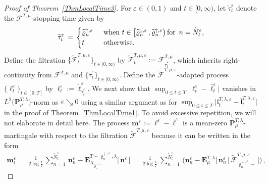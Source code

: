 \documentclass[10pt]{article}
\numberwithin{equation}{section}
\theoremstyle{definition}
\begin{document}
\begin{proof}[Proof of Theorem~\ref{ThmLocalTime3}]
For $\varepsilon\in (0,1)$ and $t\in [0,\infty)$, let   $\widetilde{\tau}_t^{\varepsilon}$ denote the $\mathscr{F}^{T,\mu}$-stopping time given  by
\begin{align*}
    \widetilde{\tau}_t^{\varepsilon}\,=\,\begin{cases}    \widetilde{\varrho}_{n}^{\uparrow,\varepsilon}   &   \,\,\,\text{when}\,\, t\in  \big[\widetilde{\varrho}_{n}^{\downarrow,\varepsilon}\,, \widetilde{\varrho}_{n}^{\uparrow,\varepsilon}\big) \,\text{for\,  $n=\widetilde{N}_{t}^{\varepsilon}$,} \\ t & \,\,\,\text{otherwise.}      \end{cases}
\end{align*}
Define the filtration $\{\widetilde{\mathscr{F}}^{T,\mu,\varepsilon}_{t}\}_{t\in [0,\infty)}$ by $\widetilde{\mathscr{F}}_{t}^{T,\mu,\varepsilon}:=\mathscr{F}_{\widetilde{\tau}_t^{\varepsilon}}^{T,\mu}$, which inherits right-continuity  from $\mathscr{F}^{T,\mu}$ and $\{\widetilde{\tau}^{\varepsilon}_t\}_{t\in [0,\infty)}$.  Define the $\widetilde{\mathscr{F}}^{T,\mu,\varepsilon}$-adapted process  $\{ \boldsymbol{\ell}_t^{\varepsilon}\}_{t\in [0,T]}$ by $\boldsymbol{\ell}_t^{\varepsilon}:=\widetilde{\ell}_{\widetilde{\tau}_t^{\varepsilon}}^{\varepsilon} $. 
 We next show that $\sup_{0\leq t\leq T}\big| \boldsymbol{\ell}_t^{\varepsilon}- \boldsymbol{\bar{\ell}}_t^{\varepsilon}\big| $
vanishes in $L^2\big(\mathbf{P}^{T,\lambda}_{\mu}\big)$-norm as $\varepsilon\searrow 0$ using a similar argument as for $\sup_{0\leq t\leq T}\big| \mathfrak{l}_t^{T,\lambda,\varepsilon}- \bar{\mathfrak{l}}_t^{T,\lambda,\varepsilon}\big| $ in the proof of Theorem~\ref{ThmLocalTime1}.  To avoid excessive repetition, we will not elaborate in detail here. The process $\mathbf{m}^{\varepsilon}:=\boldsymbol{\ell}^{\varepsilon}-\boldsymbol{\bar{\ell}}^{\varepsilon} $ is a mean-zero $\mathbf{P}^{T,\lambda}_{\mu }$-martingale with respect to the filtration $\widetilde{\mathscr{F}}^{T,\mu,\varepsilon}$ because  it can be written in the form
\begin{align*}
\mathbf{m}^{\varepsilon}_t\,=\,   \frac{1}{2\log \frac{1}{\varepsilon} } \,\sum_{n=1}^{\widetilde{N}_t^{\varepsilon}}\,  \mathbf{n}^{\varepsilon}_n-\mathbf{E}^{T-\widetilde{\varrho}_{n}^{\downarrow,\varepsilon},\lambda}_{X_{\widetilde{\varrho}_{n}^{\downarrow,\varepsilon}} }\big[\, \mathbf{n}^{\varepsilon}\,\big]  \,=\, \frac{1}{2\log \frac{1}{\varepsilon}  } \,\sum_{n=1}^{\widetilde{N}_t^{\varepsilon}} \,\bigg(  \mathbf{n}^{\varepsilon}_{n} - \mathbf{E}^{T,\lambda}_{\mu }\Big[\, \mathbf{n}^{\varepsilon}_n\,\Big|\, \widetilde{\mathscr{F}}_{\widetilde{\varrho}_{n}^{\downarrow,\varepsilon}-}^{T,\mu,\varepsilon}\, \Big]\bigg)\,,

\end{align*}
\end{proof}
\end{document}
